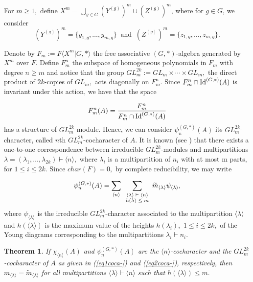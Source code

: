 \documentclass{amsart}
\newcommand{\gen}[1]{\ensuremath{\langle{#1}\rangle}}
\newcommand{\IdG}{\ensuremath{\textnormal{Id}^{(G,\ast)}}}
\newtheorem{teorema}{Theorem}[section]
\numberwithin{equation}{section}
\begin{document}
For $m \ge 1,$ define $X^m=
\bigcup\limits_{g\in G}(Y^{(g)})^m\cup (Z^{(g)})^m$, where for $g\in G$, we consider
$$(Y^{(g)})^m=\{y_{1,g}, \ldots, y_{m,g}\} \;\;\mbox{and}\;\;(Z^{(g)})^m=\{z_{1,g}, \ldots, z_{m,g}\}.$$ 

Denote by $F_m:=F\langle X^m|G,*\rangle$ the free associative $(G,*)$-algebra generated by $X^m$ over $F.$ Define $F_m^n$ the subspace of homogeneous polynomials in $F_m$ with degree $n \ge m$ and notice that the group $GL_m^{2k}:= GL_m\times \cdots \times GL_m,$ the direct product of $2k$-copies of $GL_m,$ acts diagonally on $F_m^n.$ Since $F_m^n\cap \IdG(A)$ is invariant under this action, we have that the space

 $$F_m^n(A)=\frac{F_m^n}{F_m^n\cap \IdG(A)}$$ has a structure of $GL_m^{2k}$-module. Hence, we can consider $\psi_n^{(G,*)}(A)$ its $GL_m^{2k}$-character, called $n$th $GL_m^{2k}$-cocharacter of $A.$ It is known (see \cite{Dr})  that there exists a one-to-one correspondence between irreducible $GL_m^{2k}$-modules and multipartitions $\lambda=(\lambda_1, \ldots, \lambda_{2k})\vdash \langle n \rangle,$ where $\lambda_i$ is a multipartition of $n_i$ with at most m parts, for $1 \le i \le 2k.$ Since $char(F)=0,$ by complete reducibility, we may write 
 
 \begin{equation} \label{eq2coca-}
\psi_n^{(G,*)}(A)=  \displaystyle \sum_{\langle n\rangle  } \underset{\scriptsize{\begin{array}{c}
\gen{\lambda}\vdash \gen{n} \\
			h( \lambda )\leq m
	\end{array}}}{\sum} \widetilde{m}_{\gen{\lambda}}\psi_{\gen{\lambda}},
\end{equation}  
where $\psi_{\langle \lambda \rangle}$ is the irreducible $GL_m^{2k}$-character associated to
the multipartition $\langle \lambda \rangle$ and $h(\langle \lambda \rangle)$ is the maximum value of the heights $h(\lambda_i),$ $1 \le i \le 2k,$ of the Young diagrams corresponding to the multipartitions $\lambda_i\vdash n_i.$ 

\begin{teorema}\label{multip-}
If $\chi_{\langle n \rangle}(A)$ and $\psi_n^{(G, *)}(A)$ are the $\langle n \rangle$-cocharacter and the $GL_m^{2k}$-cocharacter of $A$ as given in (\ref{eq1coca-}) and (\ref{eq2coca-}), respectively, then $m_{\langle \lambda \rangle}=\tilde{m}_{\langle \lambda \rangle}$ for all multipartitions $\langle \lambda\rangle\vdash \langle n \rangle$ such that $h(\langle \lambda \rangle)\le m.$
	
\end{teorema}
\end{document}
